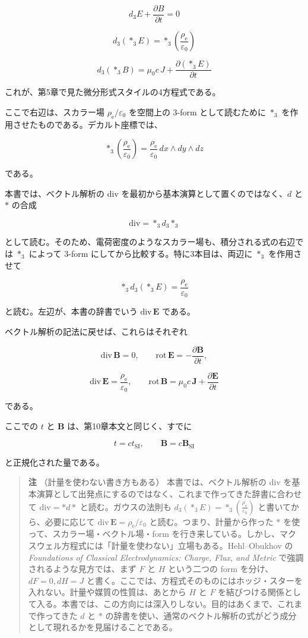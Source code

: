 \documentclass[a4paper,12pt,openany]{book}
\begin{document}
\[
d_3E+\frac{\partial B}{\partial t}=0
\]

\[
d_3(\ast_3E)=\ast_3\left(\frac{\rho_{\mathrm e}}{\varepsilon_0}\right)
\]

\[
d_3(\ast_3B)=\mu_0 c\,J+\frac{\partial(\ast_3E)}{\partial t}
\]

これが、第5章で見た微分形式スタイルの4方程式である。

ここで右辺は、スカラー場 \(\rho_{\mathrm e}/\varepsilon_0\) を空間上の
\(3\)-form として読むために \(\ast_3\)
を作用させたものである。デカルト座標では、

\[
\ast_3\left(\frac{\rho_{\mathrm e}}{\varepsilon_0}\right)=\frac{\rho_{\mathrm e}}{\varepsilon_0}\,dx\wedge dy\wedge dz
\]

である。

本書では、ベクトル解析の \(\mathrm{div}\)
を最初から基本演算として置くのではなく、\(d\) と \(\ast\) の合成

\[
\mathrm{div}=\ast_3 d_3\ast_3
\]

として読む。そのため、電荷密度のようなスカラー場も、積分される式の右辺では
\(\ast_3\) によって \(3\)-form にしてから比較する。特に3本目は、両辺に
\(\ast_3\) を作用させて

\[
\ast_3d_3(\ast_3E)=\frac{\rho_{\mathrm e}}{\varepsilon_0}
\]

と読む。左辺が、本書の辞書でいう \(\mathrm{div}\,\mathbf E\) である。

ベクトル解析の記法に戻せば、これらはそれぞれ

\[
\mathrm{div}\,\mathbf B=0,
\qquad
\mathrm{rot}\,\mathbf E=-\frac{\partial\mathbf B}{\partial t},
\]

\[
\mathrm{div}\,\mathbf E=\frac{\rho_{\mathrm e}}{\varepsilon_0},
\qquad
\mathrm{rot}\,\mathbf B=\mu_0 c\,\mathbf J+\frac{\partial\mathbf E}{\partial t}
\]

である。

ここでの \(t\) と \(\mathbf B\) は、第10章本文と同じく、すでに

\[
t=ct_{\mathrm{SI}},
\qquad
\mathbf B=c\mathbf B_{\mathrm{SI}}
\]

と正規化された量である。

\begin{quote}
\textbf{注} （計量を使わない書き方もある） 本書では、ベクトル解析の
\(\mathrm{div}\)
を基本演算として出発点にするのではなく、これまで作ってきた辞書に合わせて
\(\mathrm{div}=\ast d\ast\) と読む。ガウスの法則も
\(d_3(\ast_3E) = \ast_3\left(\frac{\rho_{\mathrm e}}{\varepsilon_0}\right)\)
と書いてから、必要に応じて
\(\mathrm{div}\,\mathbf E=\rho_{\mathrm e}/\varepsilon_0\)
と読む。つまり、計量から作った \(\ast\)
を使って、スカラー場・ベクトル場・form
を行き来している。しかし、マクスウェル方程式には「計量を使わない」立場もある。Hehl–Obukhov
の \emph{Foundations of Classical Electrodynamics: Charge, Flux, and
Metric} で強調されるような見方では、まず \(F\) と \(H\) という二つの
form を分け、\(dF=0, dH=J\)
と書く。ここでは、方程式そのものにはホッジ・スターを入れない。計量や媒質の性質は、あとから
\(H\) と \(F\)
を結びつける関係として入る。本書では、この方向には深入りしない。目的はあくまで、これまで作ってきた
\(d\) と \(\ast\)
の辞書を使い、通常のベクトル解析の式がどう成分として現れるかを見届けることである。
\end{quote}
\end{document}
